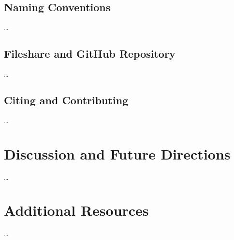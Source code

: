 \documentclass[
]{article}
\begin{document}
\hypertarget{naming-conventions}{%
\subsection{Naming Conventions}\label{naming-conventions}}

\ldots{}

\hypertarget{fileshare-and-github-repository}{%
\subsection{Fileshare and GitHub Repository}\label{fileshare-and-github-repository}}

\ldots{}

\hypertarget{citing-and-contributing}{%
\subsection{Citing and Contributing}\label{citing-and-contributing}}

\ldots{}

\hypertarget{discussion-and-future-directions}{%
\section{Discussion and Future Directions}\label{discussion-and-future-directions}}

\ldots{}

\hypertarget{additional-resources}{%
\section{Additional Resources}\label{additional-resources}}

\ldots{}

\newpage
\singlespacing
{}


\end{document}
